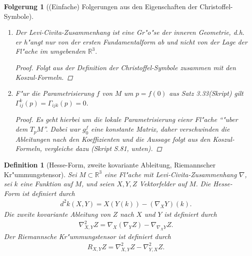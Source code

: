 \documentclass[10pt,a4paper]{article}
\newcommand{\fc}[1]{\special{fc=#1}}
\newtheorem{defi}[sat]{Definition}
\newtheorem{folg}[sat]{Folgerung}
\begin{document}
\fc{FausECS}
\begin{folg}[(Einfache) Folgerungen aus den Eigenschaften der Christoffel-Symbole]
\begin{enumerate}
 \item Der Levi-Civita-Zusammenhang ist eine Gr"o"se der inneren Geometrie, d.h. er h"angt nur von der ersten
 Fundamentalform ab und nicht von der Lage der Fl"ache im umgebenden $\mathbb{R}^3$.
 \begin{proof}
  Folgt aus der Definition der Christoffel-Symbole zusammen mit den Koszul-Formeln.
 \end{proof}
\item 
F"ur die Parametrisierung $f$ von $M$ um $p=f(0)$ aus Satz 3.33(Skript) gilt $\Gamma_{ij}^k(p) = \Gamma_{ijk}(p)=0$.
\begin{proof}
 Es geht hierbei um die lokale Parametrisierung eienr Fl"ache ``"uber dem $T_pM$''. Dabei war $g^f_0$ eine konstante Matrix,
 daher verschwinden die Ableitungen nach den Koeffizienten und die Aussage folgt aus den Koszul-Formeln, vergleiche dazu (Skript S.81, unten).
\end{proof}
\end{enumerate}
\end{folg}



\fc{DHesseFormUSW}
\begin{defi}[Hesse-Form, zweite kovariante Ableitung, Riemannscher Kr"ummungstensor]
 Sei $M\subset \mathbb{R}^3$ eine  Fl"ache mit Levi-Civita-Zusammenhang $\nabla$, sei $k$ eine Funktion auf $M$, und
 seien $X,Y,Z$ Vektorfelder auf $M$. Die Hesse-Form ist definiert durch
 \begin{equation*}\begin{aligned}
  d^2k(X,Y) = X(Y(k)) - (\nabla_XY)(k).
 \end{aligned}\end{equation*}
Die zweite kovariante Ableitung von $Z$ nach $X$ und $Y$ ist definiert durch 
\begin{equation*}\begin{aligned}
 \nabla^2_{X,Y} Z = \nabla_X\left( \nabla_Y Z \right) - \nabla_{\nabla_X Y}Z.
\end{aligned}\end{equation*}
Der Riemannsche Kr"ummungstensor ist definiert durch 
\begin{equation*}\begin{aligned}
R_{X,Y}Z =  \nabla^2_{X,Y} Z - \nabla^2_{Y,X} Z.
\end{aligned}\end{equation*}




\end{defi}
\end{document}
